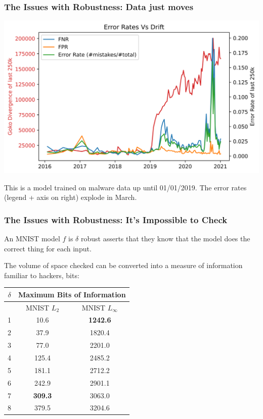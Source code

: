 \documentclass{beamer}
\begin{document}
\begin{frame}
    \frametitle{The Issues with Robustness: Data just moves}
    \begin{center}
        \includegraphics[scale=0.6]{overall_vs_error.png}

        This is a model trained on malware data up until 01/01/2019. The error rates (legend + axis on right) explode in March. \cite{BayesianCovertreeICLR}
    \end{center}
\end{frame}

\begin{frame}
    \frametitle{The Issues with Robustness: It's Impossible to Check}
    An MNIST model $f$ is $\delta$ robust asserts that they know that the model does the correct thing for each input.

    \vspace{10pt}
    The volume of space checked can be converted into a measure of information familiar to hackers, bits:
    
    \begin{center}
        \begin{tabular}{| c || c | c |}
            \hline
            $\delta$ & \multicolumn{2}{|c|}{Maximum Bits of Information} \\
            \hline
            & MNIST $L_2$ & MNIST $L_\infty$ \\
            \hline
        
            1 & 10.6 & \textbf{1242.6} \\
            2 & 37.9 & 1820.4 \\
            3 & 77.0 & 2201.0 \\
            4 & 125.4 & 2485.2 \\
            5 & 181.1 & 2712.2 \\
            6 & 242.9 & 2901.1 \\
            7 & \textbf{309.3} & 3063.0 \\
            8 & 379.5 & 3204.6 \\
        \hline
        \end{tabular}
    \end{center}
\end{frame}
\end{document}
